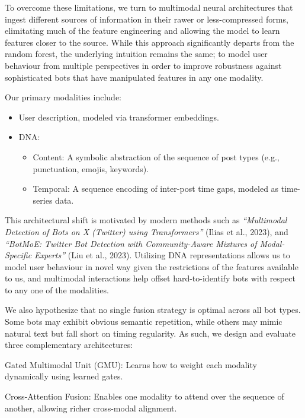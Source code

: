 \documentclass[conference]{IEEEtran}
\begin{document}
To overcome these limitations, we turn to multimodal neural architectures 
that ingest different sources of information in their rawer or less-compressed 
forms, elimitating much of the feature engineering and allowing the model to learn features closer to the source. 
While this approach significantly departs from the random forest, 
the underlying intuition remains the same; to model user behaviour from multiple perspectives
in order to improve robustness against sophisticated bots that have manipulated features in any one modality.

Our primary modalities include:
\begin{itemize}
    \item User description, modeled via transformer embeddings.
    \item DNA:
    \begin{itemize}
        \item Content: A symbolic abstraction of the sequence of post types (e.g., punctuation, emojis, keywords).
        
        \item Temporal: A sequence encoding of inter-post time gaps, modeled as time-series data.
    \end{itemize}
    
\end{itemize}

This architectural shift is motivated by modern methods such as \textit{``Multimodal Detection of Bots on X (Twitter) using
Transformers''} (Ilias et al., 2023), and \textit{``BotMoE: Twitter Bot Detection with Community-Aware
Mixtures of Modal-Specific Experts''} (Liu et al., 2023). Utilizing DNA representations allows us to 
model user behaviour in novel way given the restrictions of the features available to us, and multimodal interactions
help offset hard-to-identify bots with respect to any one of the modalities.

We also hypothesize that no single fusion strategy is optimal across all bot types. Some bots may exhibit obvious semantic repetition, while others may mimic natural text but fall short on timing regularity. As such, we design and evaluate three complementary architectures:

Gated Multimodal Unit (GMU): Learns how to weight each modality dynamically using learned gates.

Cross-Attention Fusion: Enables one modality to attend over the sequence of another, allowing richer cross-modal alignment.
\end{document}
